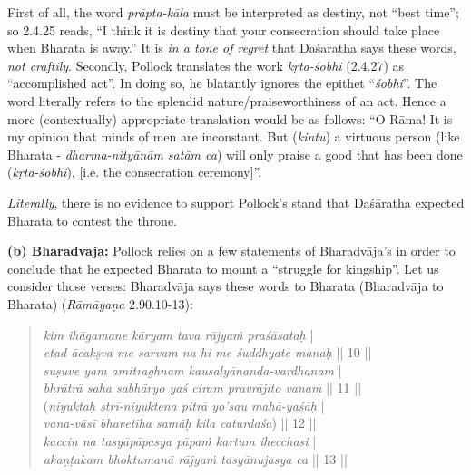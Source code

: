 First of all, the word {\sl prāpta-kāla} must be interpreted as destiny, not “best time”; so 2.4.25 reads, “I think it is destiny that your consecration should take place when Bharata is away.” It is {\sl in a tone of regret} that Daśaratha says these words, {\sl not craftily}. Secondly, Pollock translates the work {\sl kṛta-śobhi} (2.4.27) as “accomplished act”. In doing so, he blatantly ignores the epithet “{\sl śobhi}”. The word literally refers to the splendid nature/praiseworthiness of an act. Hence a more (contextually) appropriate translation would be as follows: “O Rāma! It is my opinion that minds of men are inconstant. But ({\sl kintu}) a virtuous person (like Bharata - {\sl dharma-nityānām satām ca}) will only praise a good that has been done ({\sl kṛta-śobhi}), [i.e. the consecration ceremony]”.

{\sl Literally}, there is no evidence to support Pollock’s stand that Daśāratha expected Bharata to contest the throne. 

\noindent
\textbf{(b) Bharadvāja:} Pollock relies on a few statements of Bharadvāja’s in order to conclude that he expected Bharata to mount a “struggle for kingship”. Let us consider those verses: Bharadvāja says these words to Bharata (Bharadvāja to Bharata) ({\sl Rāmāyaṇa} 2.90.10-13):\\[-21pt] 
\begin{quote}
{{\sl kim ihāgamane kāryam tava rājyaṁ praśāsataḥ}}\label{verse28} |\\
{{\sl etad ācakṣva me sarvam na hi me śuddhyate manaḥ}} || 10 ||\\
{\sl suṣuve yam amitraghnam kausalyānanda-vardhanam}\label{verse29} |\\
{\sl bhrātrā saha sabhāryo yaś ciram pravrājito vanam} || 11 ||\\
({\sl niyuktaḥ strī-niyuktena pitrā yo’sau mahā-yaśāḥ}\label{verse30} |\\
{\sl vana-vāsī bhavetīha samāḥ kila caturdaśa}) || 12 ||\\
{\sl kaccin na tasyāpāpasya pāpaṁ kartum ihecchasi}\label{verse31} |\\
{\sl akaṇṭakam bhoktumanā rājyaṁ tasyānujasya ca} || 13 ||
\end{quote}

